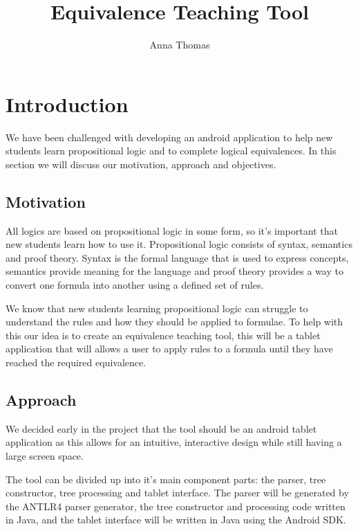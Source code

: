 \documentclass{report}
\begin{document}
 

\title{Equivalence Teaching Tool} 
\author{Anna Thomas} 

\maketitle 

\tableofcontents 

\chapter{Introduction} 


We have been challenged with developing an android application to help new students learn propositional logic and to complete logical equivalences. In this section we will discuss our motivation, approach and objectives.

\section{Motivation} 
All logics are based on propositional logic in some form, so it's important that new students learn how to use it. Propositional logic consists of syntax, semantics and proof theory. Syntax is the formal language that is used to express concepts, semantics provide meaning for the language and proof theory provides a way to convert one formula into another using a defined set of rules.

We know that new students learning propositional logic can struggle to understand the rules and how they should be applied to formulae. To help with this our idea is to create an equivalence teaching tool, this will be a tablet application that will allows a user to apply rules to a formula until they have reached the required equivalence.

\section{Approach}

We decided early in the project that the tool should be an android tablet application as this allows for an intuitive, interactive design while still having a large screen space.

The tool can be divided up into it's main component parts: the parser, tree constructor, tree processing and tablet interface. The parser will be generated by the ANTLR4 parser generator, the tree constructor and processing code written in Java, and the tablet interface will be written in Java using the Android SDK.
\end{document}
